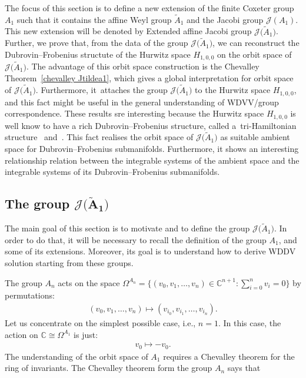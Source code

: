 \documentclass[pdftex]{sigma}%
\numberwithin{equation}{section}
\newcommand{\Ja}{\mathcal{J}}
\begin{document}
 The focus of this section is to define a new extension of the finite Coxeter group $A_1$ such that it contains the affine Weyl group $\tilde A_1$ and the Jacobi group $\Ja(A_1)$. This new extension will be denoted by Extended affine Jacobi group $\Ja\big(\tilde A_1\big)$. Further, we prove that, from the data of the group $\Ja\big(\tilde A_1\big)$, we can reconstruct the Dubrovin--Frobenius structute of the Hurwitz space $H_{1,0,0}$ on the orbit space of $\Ja\big(\tilde A_1\big)$. The advantage of this orbit space construction is the Chevalley Theorem~\ref{chevalley Jtildea1}, which gives a global interpretation for orbit space of $\Ja\big(\tilde A_1\big)$. Furthermore, it~attaches the group $\Ja\big(\tilde A_1\big)$ to the Hurwitz space $H_{1,0,0}$, and this fact might be useful in the general understanding of WDVV/group correspondence. These results sre interesting because the Hurwitz space $H_{1,0,0}$ is well know to have a rich Dubrovin--Frobenius structure, called a~tri-Hamiltonian structure~\cite{Romano1} and~\cite{Pavlov2}. This fact realises the orbit space of $\Ja\big(\tilde A_1\big)$ as suitable ambient space for Dubrovin--Frobenius submanifolds. Furthermore, it shows an interesting relationship relation between the integrable systems of the ambient space and the integrable systems of its Dubrovin--Frobenius submanifolds.

\subsection[The group J(A1)]
{The group $\boldsymbol{\Ja\big(\tilde A_1\big)}$}\label{group def}

The main goal of this section is to motivate and to define the group $\Ja\big(\tilde A_1\big)$. In order to do that, it will be necessary to recall the definition of the group $A_1$, and some of its extensions. Moreover, its goal is to understand how to derive WDDV solution starting from these groups.

The group $A_n$ acts on the space $\Omega^{A_n}=\big\{(v_0,v_1,\dots,v_n)\in \mathbb{C}^{n+1}\colon\sum _{i=0}^nv_i=0 \big\}$ by permutations:
\begin{gather}\label{An action permutation}
(v_0,v_1,\dots,v_n)\mapsto(v_{i_0},v_{i_1},\dots,v_{i_n}).
\end{gather}
Let us concentrate on the simplest possible case, i.e., $n=1$. In this case, the action on $\mathbb{C}\cong\Omega^{A_1}$ is just:
\begin{gather*}
v_0\mapsto -v_0.
\end{gather*}
The understanding of the orbit space of $A_1$ requires a Chevalley theorem for the ring of invariants. The Chevalley theorem form the group $A_n$ says that
\end{document}
